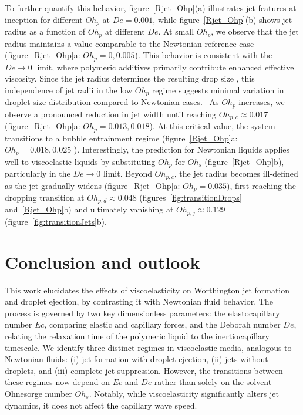 \documentclass{jfm}
\newcommand{\DL}[1]{{\textcolor{black}{#1}}}
\newcommand{\oo}{\color{magenta} \normalfont}
\newcommand{\bb}{\color{black} \normalfont}
\begin{document}
To further quantify this behavior, figure~\ref{Rjet_Ohp}(a) illustrates jet features at inception for different $Oh_p$ at $De = 0.001$, while figure~\ref{Rjet_Ohp}(b) shows jet radius as a function of $Oh_p$ at different $De$.
\oo At small $Oh_p$, we observe that the jet radius maintains a value comparable to the Newtonian reference case (figure~\ref{Rjet_Ohp}a: $Oh_p = 0, 0.005$). This behavior is consistent with the $De \to 0$ limit, where polymeric additives primarily contribute enhanced effective viscosity. Since the jet radius determines the resulting drop size \citep{ganan2017revision,blanco2020sea}, this independence of jet radii in the low $Oh_p$ regime suggests minimal variation in droplet size distribution compared to Newtonian cases.\bb\,
As $Oh_p$ increases, we observe a pronounced reduction in jet width until reaching $Oh_{p,c} \approx 0.017$ (figure~\ref{Rjet_Ohp}a: $Oh_p = 0.013, 0.018$). At this critical value, the system transitions to a bubble entrainment regime (figure~\ref{Rjet_Ohp}a: $Oh_p = 0.018, 0.025$ \citet{gordillo2019capillary,blanco2020sea, rodriguez2023bubble}).
Interestingly, the prediction for Newtonian liquids applies well to viscoelastic liquids by substituting $Oh_p$ for $Oh_s$ (figure~\ref{Rjet_Ohp}b), particularly in the $De \to 0$ limit.
Beyond $Oh_{p,c}$, the jet radius becomes ill-defined as the jet gradually widens (figure~\ref{Rjet_Ohp}a: $Oh_p = 0.035$), first reaching the dropping transition at $Oh_{p,d} \approx 0.048$ (figures~\ref{fig:transitionDrops} and~\ref{Rjet_Ohp}b) and ultimately vanishing at $Oh_{p,j} \approx 0.129$ (figure~\ref{fig:transitionJets}b).


\section{Conclusion and outlook}
\label{sec:Conclusion}

This work elucidates the effects of viscoelasticity on Worthington jet formation and droplet ejection, \DL{by} contrasting \DL{it} with Newtonian fluid behavior. The process is governed by two key dimensionless parameters: the elastocapillary number $Ec$, comparing elastic and capillary forces, and the Deborah number $De$, relating the \DL{relaxation time of the polymeric liquid} to the inertiocapillary timescale. We identify three distinct regimes in viscoelastic media, analogous to Newtonian fluids: (i) jet formation with droplet ejection, (ii) jets without droplets, and (iii) complete jet suppression. However, the transitions between these regimes now depend on $Ec$ and $De$ rather than solely on the solvent Ohnesorge number $Oh_s$. Notably, while viscoelasticity significantly alters jet dynamics, it does not affect \DL{the} capillary wave speed.
\end{document}
